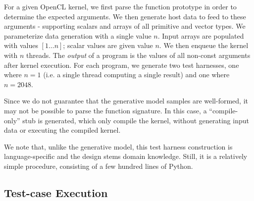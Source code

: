For a given OpenCL kernel, we first parse the function prototype in order to determine the expected arguments. We then generate host data to feed to these arguments - supporting scalars and arrays of all primitive and vector types. We parameterize data generation with a single value $n$. Input arrays are populated with values {$[1 \ldots n]$}; scalar values are given value $n$. We then enqueue the kernel with $n$ threads. The \emph{output} of a program is the values of all non-const arguments after kernel execution. For each program, we generate two test harnesses, one where $n=1$ (i.e. a single thread computing a single result) and one where $n = 2048$.

Since we do not guarantee that the generative model samples are well-formed, it may not be possible to parse the function signature. In this case, a ``compile-only'' stub is generated, which only compile the kernel, without generating input data or executing the compiled kernel.

We note that, unlike the generative model, this test harness construction is language-specific and the design stems domain knowledge. Still, it is a relatively simple procedure, consisting of a few hundred lines of Python.



\subsection{Test-case Execution}

